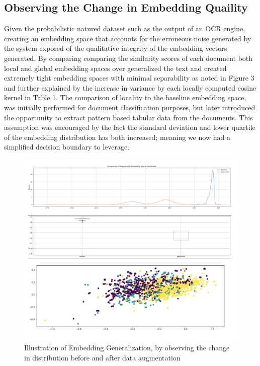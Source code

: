 \documentclass{article}
\begin{document}
\subsection{Observing the Change in Embedding Quaility}
Given the probabilistic natured dataset such as the output of an OCR engine, creating an embedding space that accounts for the erroneous noise generated by the system exposed of the qualitative integrity of the embedding vectors generated. By comparing comparing the similarity scores of each document both local and global embedding spaces over generalized the text and created extremely tight embedding spaces with minimal separability as noted in Figure 3 and further explained by the increase in variance by each locally computed cosine kernel in Table 1. The comparison of locality to the baseline embedding space, was initially performed for document classification purposes, but later introduced the opportunity to extract pattern based tabular data from the documents. This assumption was encouraged by the fact the standard deviation and lower quartile of the embedding distribution has both increased; meaning we now had a simplified decision boundary to leverage.
\graphicspath{{images}}
\begin{figure}[htp]
    \center
    \includegraphics[scale=.33]{results1}
    \caption{Illustration of Embedding Generalization, by observing the change in distribution before and after data augmentation}
    \label{fig:res1} 
\end{figure}
\end{document}
